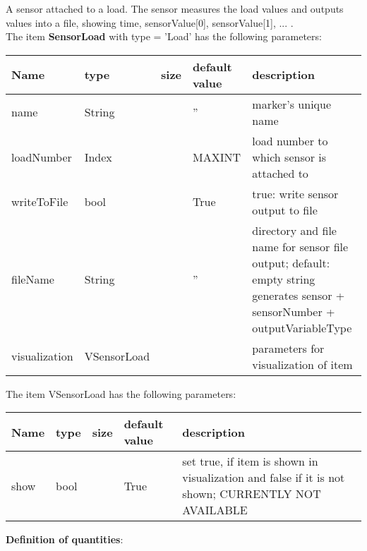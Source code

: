 A sensor attached to a load. The sensor measures the load values and outputs values into a file, showing time, sensorValue[0], sensorValue[1], ... .
 \\\vspace{12pt} \noindent The item {\bf SensorLoad} with type = 'Load' has the following parameters:\vspace{-1cm}\\ 
\begin{center}
  \footnotesize
  \begin{longtable}{| p{4.5cm} | p{2.5cm} | p{0.5cm} | p{2.5cm} | p{6cm} |}
    \hline
    \bf Name & \bf type & \bf size & \bf default value & \bf description \\ \hline
    name &     String &      &     '' &     marker's unique name\\ \hline
    loadNumber &     Index &      &     MAXINT &     load number to which sensor is attached to\\ \hline
    writeToFile &     bool &      &     True &     true: write sensor output to file\\ \hline
    fileName &     String &      &     '' &     directory and file name for sensor file output; default: empty string generates sensor + sensorNumber + outputVariableType\\ \hline
    visualization & VSensorLoad & & & parameters for visualization of item \\ \hline
	  \end{longtable}
	\end{center}
The item VSensorLoad has the following parameters:\vspace{-1cm}\\ 
\begin{center}
  \footnotesize
  \begin{longtable}{| p{4.5cm} | p{2.5cm} | p{0.5cm} | p{2.5cm} | p{6cm} |}
    \hline
    \bf Name & \bf type & \bf size & \bf default value & \bf description \\ \hline
    show &     bool &      &     True &     set true, if item is shown in visualization and false if it is not shown; CURRENTLY NOT AVAILABLE\\ \hline
	  \end{longtable}
	\end{center}
{\bf Definition of quantities}:\\
